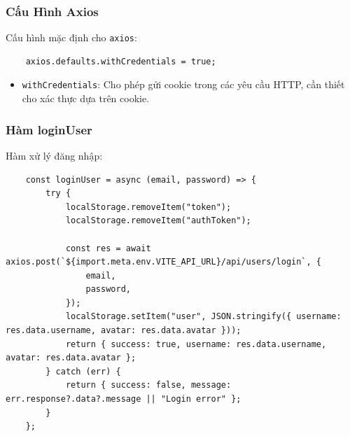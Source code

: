             \subsubsection{Cấu Hình Axios}
                \hspace*{0.6cm}Cấu hình mặc định cho \texttt{axios}:
                \begin{lstlisting}
    axios.defaults.withCredentials = true;
                \end{lstlisting}
                \begin{itemize}
                    \item \texttt{withCredentials}: Cho phép gửi cookie trong các yêu cầu HTTP, cần thiết cho xác thực dựa trên cookie.
                \end{itemize}

            \subsubsection{Hàm loginUser}
                \hspace*{0.6cm}Hàm xử lý đăng nhập:
                \begin{lstlisting}
    const loginUser = async (email, password) => {
        try {
            localStorage.removeItem("token");
            localStorage.removeItem("authToken");

            const res = await axios.post(`${import.meta.env.VITE_API_URL}/api/users/login`, {
                email,
                password,
            });
            localStorage.setItem("user", JSON.stringify({ username: res.data.username, avatar: res.data.avatar }));
            return { success: true, username: res.data.username, avatar: res.data.avatar };
        } catch (err) {
            return { success: false, message: err.response?.data?.message || "Login error" };
        }
    };
                \end{lstlisting}
